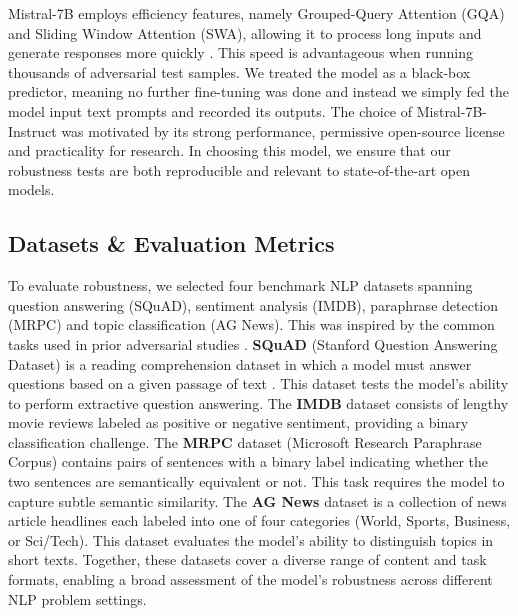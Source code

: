 \documentclass[conference]{IEEEtran}
\begin{document}
Mistral-7B employs efficiency features, namely Grouped-Query Attention (GQA) and Sliding Window Attention (SWA), allowing it to process long inputs and generate responses more quickly \cite{mistral2023}. This speed is advantageous when running thousands of adversarial test samples. We treated the model as a black-box predictor, meaning no further fine-tuning was done and instead we simply fed the model input text prompts and recorded its outputs. The choice of Mistral-7B-Instruct was motivated by its strong performance, permissive open-source license and practicality for research. In choosing this model, we ensure that our robustness tests are both reproducible and relevant to state-of-the-art open models.

\subsection{Datasets \& Evaluation Metrics}

To evaluate robustness, we selected four benchmark NLP datasets spanning question answering (SQuAD), sentiment analysis (IMDB), paraphrase detection (MRPC) and topic classification (AG News). This was inspired by the common tasks used in prior adversarial studies \cite{yang2024}. \textbf{SQuAD} (Stanford Question Answering Dataset) is a reading comprehension dataset in which a model must answer questions based on a given passage of text \cite{rajpurkar2016}. This dataset tests the model’s ability to perform extractive question answering. The \textbf{IMDB} dataset consists of lengthy movie reviews labeled as positive or negative sentiment, providing a binary classification challenge. The \textbf{MRPC} dataset (Microsoft Research Paraphrase Corpus) contains pairs of sentences with a binary label indicating whether the two sentences are semantically equivalent or not. This task requires the model to capture subtle semantic similarity. The \textbf{AG News} dataset is a collection of news article headlines each labeled into one of four categories (World, Sports, Business, or Sci/Tech). This dataset evaluates the model’s ability to distinguish topics in short texts. Together, these datasets cover a diverse range of content and task formats, enabling a broad assessment of the model’s robustness across different NLP problem settings.
\end{document}
